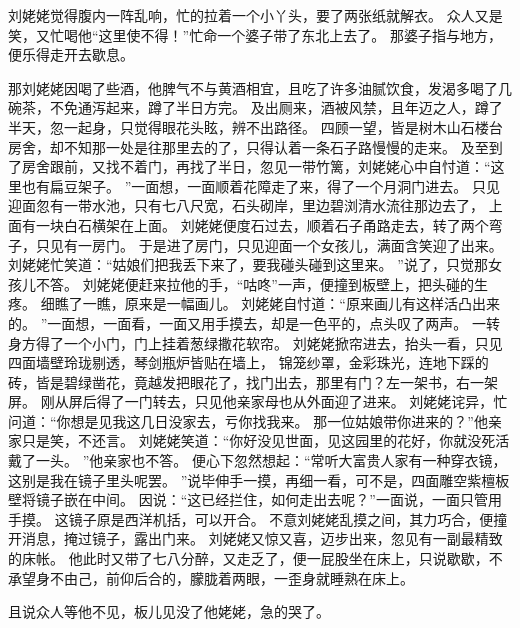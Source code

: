 刘姥姥觉得腹内一阵乱响，忙的拉着一个小丫头，要了两张纸就解衣。
众人又是笑，又忙喝他“这里使不得！”忙命一个婆子带了东北上去了。
那婆子指与地方，便乐得走开去歇息。
\par
那刘姥姥因喝了些酒，他脾气不与黄酒相宜，且吃了许多油腻饮食，发渴多喝了几碗茶，不免通泻起来，蹲了半日方完。
及出厕来，酒被风禁，且年迈之人，蹲了半天，忽一起身，只觉得眼花头眩，辨不出路径。
四顾一望，皆是树木山石楼台房舍，却不知那一处是往那里去的了，只得认着一条石子路慢慢的走来。
及至到了房舍跟前，又找不着门，再找了半日，忽见一带竹篱，刘姥姥心中自忖道：“这里也有扁豆架子。
”一面想，一面顺着花障走了来，得了一个月洞门进去。
只见迎面忽有一带水池，只有七八尺宽，石头砌岸，里边碧浏清水流往那边去了，
上面有一块白石横架在上面。
刘姥姥便度石过去，顺着石子甬路走去，转了两个弯子，只见有一房门。
于是进了房门，只见迎面一个女孩儿，满面含笑迎了出来。
刘姥姥忙笑道：“姑娘们把我丢下来了，要我碰头碰到这里来。
”说了，只觉那女孩儿不答。
刘姥姥便赶来拉他的手，“咕咚”一声，便撞到板壁上，把头碰的生疼。
细瞧了一瞧，原来是一幅画儿。
刘姥姥自忖道：“原来画儿有这样活凸出来的。
”一面想，一面看，一面又用手摸去，却是一色平的，点头叹了两声。
一转身方得了一个小门，门上挂着葱绿撒花软帘。
刘姥姥掀帘进去，抬头一看，只见四面墙壁玲珑剔透，琴剑瓶炉皆贴在墙上，
锦笼纱罩，金彩珠光，连地下踩的砖，皆是碧绿凿花，竟越发把眼花了，找门出去，那里有门？左一架书，右一架屏。
刚从屏后得了一门转去，只见他亲家母也从外面迎了进来。
刘姥姥诧异，忙问道：“你想是见我这几日没家去，亏你找我来。
那一位姑娘带你进来的？”他亲家只是笑，不还言。
刘姥姥笑道：“你好没见世面，见这园里的花好，你就没死活戴了一头。
”他亲家也不答。
便心下忽然想起：“常听大富贵人家有一种穿衣镜，这别是我在镜子里头呢罢。
”说毕伸手一摸，再细一看，可不是，四面雕空紫檀板壁将镜子嵌在中间。
因说：“这已经拦住，如何走出去呢？”一面说，一面只管用手摸。
这镜子原是西洋机括，可以开合。
不意刘姥姥乱摸之间，其力巧合，便撞开消息，掩过镜子，露出门来。
刘姥姥又惊又喜，迈步出来，忽见有一副最精致的床帐。
他此时又带了七八分醉，又走乏了，便一屁股坐在床上，只说歇歇，不承望身不由己，前仰后合的，朦胧着两眼，一歪身就睡熟在床上。
\par
且说众人等他不见，板儿见没了他姥姥，急的哭了。
